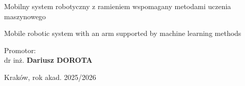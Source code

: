 \begin{titlepage}
\begin{center}
Mobilny system robotyczny z ramieniem wspomagany metodami uczenia maszynowego \\
\vspace{0.3cm}

Mobile robotic system with an arm supported by machine learning methods

\end{center}

\vspace{2cm}

\begin{center}
\large Promotor: \\ dr inż. \textbf{Dariusz DOROTA}
\end{center}

\vspace{1cm}

\begin{center}
\Large Kraków, rok akad. 2025/2026
\end{center}
\end{titlepage}

\shipout\null